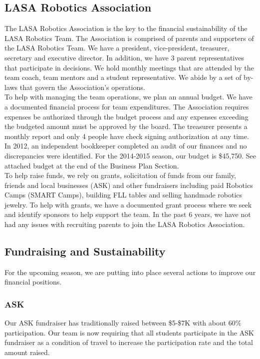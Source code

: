 \subsection{LASA Robotics Association}
The LASA Robotics Association is the key to the financial sustainability of the LASA Robotics Team.  The Association is comprised of parents and supporters of the LASA Robotics Team.   We have a president, vice-president, treasurer, secretary and executive director.  In addition, we have 3 parent representatives that participate in decisions.  We hold monthly meetings that are attended by the team coach, team mentors and a student representative. We abide by a set of by-laws that govern the Association’s operations.\\

To help with managing the team operations, we plan an annual budget. We have a documented financial process for team expenditures. The Association requires expenses be authorized through the budget process and any expenses exceeding the budgeted amount must be approved by the board. The treasurer presents a monthly report and only 4 people have check signing authorization at any time. In 2012, an independent bookkeeper completed an audit of our finances and no discrepancies were identified. For the 2014-2015 season, our budget is \$45,750.  See attached budget at the end of the Business Plan Section.\\

To help raise funds, we rely on grants, solicitation of funds from our family, friends and local businesses (ASK) and other fundraisers including paid Robotics Camps (SMART Camps), building FLL tables and selling handmade robotics jewelry.  To help with grants, we have a documented grant process where we seek and identify sponsors to help support the team. In the past 6 years, we have not had any issues with recruiting parents to join the LASA Robotics Association.

\subsection{Fundraising and Sustainability}
For the upcoming season, we are putting into place several actions to improve our financial positions.

\subsubsection{ASK}
Our ASK fundraiser has traditionally raised between \$5-\$7K with about 60\% participation.  Our team is now requiring that all students participate in the ASK fundraiser as a condition of travel to increase the participation rate and the total amount raised.  

